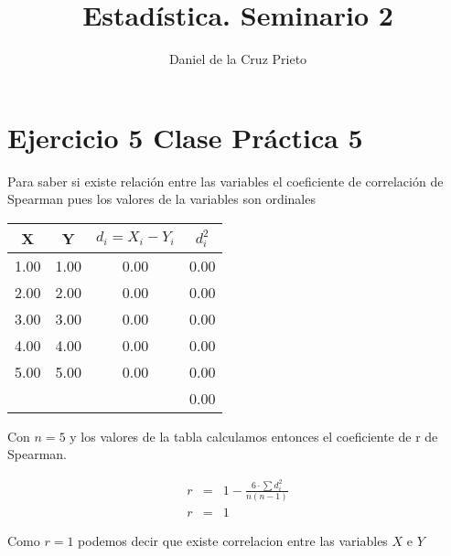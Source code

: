 \documentclass{article}
\begin{document}
	\title{Estad\'istica.  Seminario 2}
	\author{Daniel de la Cruz Prieto} 
	\maketitle
	
	\section*{Ejercicio 5 Clase Pr\'actica 5}
	
	\begin{flushleft}
		Para saber si existe relaci\'on entre las variables el coeficiente de correlaci\'on de Spearman pues los valores de la variables son ordinales
	\end{flushleft}
	
	\begin{table}[ht]
		\centering
		\begin{tabular}{|cccc|}
			\hline
			\rowcolor[gray]{0.9} X & Y & $d_{i}= X_i -Y_i$ & $d_{i}^{2}$ \\ 
			\hline
			1.00 & 1.00 & 0.00 & 0.00 \\ 
			2.00 & 2.00 & 0.00 & 0.00 \\ 
			3.00 & 3.00 & 0.00 & 0.00 \\ 
			4.00 & 4.00 & 0.00 & 0.00 \\ 
			5.00 & 5.00 & 0.00 & 0.00 \\ 
			\hline
	        &&& \cellcolor[gray]{0.9} 0.00  \\
			\hline
		\end{tabular}
	\end{table}
	
	\begin{flushleft}
		Con $n=5$ y los valores de la tabla calculamos entonces el coeficiente de r de Spearman.
	\end{flushleft}
	
	\begin{equation*}
		\begin{array}{rcl}
		r & = &\displaystyle 1- \frac{6 \cdot \sum d_{i}^{2}}{n\left(n-1\right)} \\
		r & = & 1 
		\end{array}
	\end{equation*}
	
	\begin{flushleft}
			Como $r=1$ podemos decir que existe correlacion entre las variables $X$ e $Y$
	\end{flushleft}
\end{document}
